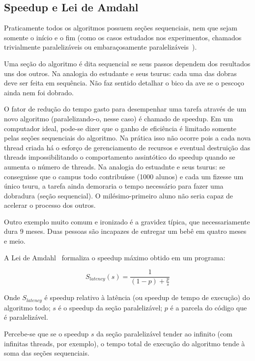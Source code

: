 \documentclass{article}
\begin{document}
\subsection{Speedup e Lei de Amdahl}
\label{ssec:lei de amdahl}

 Praticamente todos os algoritmos possuem seções sequenciais, nem que sejam somente o início e o fim (como os casos estudados nos experimentos, chamados trivialmente paralelizáveis ou embaraçosamente paralelizáveis~\cite{pacheco11}).

Uma seção do algoritmo é dita sequencial se seus passos dependem dos resultados uns dos outros. Na analogia do estudante e seus tsurus: cada uma das dobras deve ser feita em sequência. Não faz sentido detalhar o bico da ave se o pescoço ainda nem foi dobrado.

O fator de redução do tempo gasto para desempenhar uma tarefa através de um novo algoritmo (paralelizando-o, nesse caso) é chamado de speedup. Em um computador ideal, pode-se dizer que o ganho de eficiência é limitado somente pelas seções sequenciais do algoritmo. Na prática isso não ocorre pois a cada nova thread criada há o esforço de gerenciamento de recursos e eventual destruição das threads impossibilitando o comportamento assintótico do speedup quando se aumenta o número de threads. Na analogia do estuadnte e seus tsurus: se conseguisse que o campus todo contribuísse (1000 alunos) e cada um fizesse um único tsuru, a tarefa ainda demoraria o tempo necessário para fazer uma dobradura (seção sequencial). O milésimo-primeiro aluno não seria capaz de acelerar o processo dos outros.

Outro exemplo muito comum e ironizado é a gravidez típica, que necessariamente dura 9 meses. Duas pessoas são incapazes de entregar um bebê em quatro meses e meio.

A Lei de Amdahl~\cite{bryant2003computer} formaliza o speedup máximo obtido em um programa:

\begin{equation}
\label{formula:amdahl}
    S_{latency} \left ( s \right ) = \frac{1}{\left ( 1 - p\right )+ \frac{p}{s}}
\end{equation}

Onde $S_{latency}$ é speedup relativo à latência (ou speedup de tempo de execução) do algoritmo todo; $s$ é o speedup da seção paralelizável; $p$ é a parcela do código que é paralelizável.

Percebe-se que se o speedup $s$ da seção paralelizável tender ao infinito (com infinitas threads, por exemplo), o tempo total de execução do algoritmo tende à soma das seções sequenciais.
\end{document}
